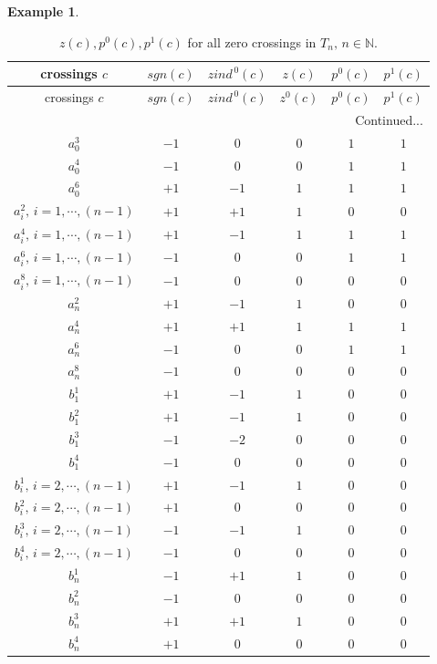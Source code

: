 \documentclass[10pt,a4paper,reqno]{amsart}
\theoremstyle{definition}
\newtheorem{example}{Example}[section]
\theoremstyle{remark}
\begin{document}
\begin{example}
\begin{longtable}{|c|c|c|c|c|c|}
	\hline
	crossings $c$ & $sgn(c)$ & $zind^{\,0}(c)$ & $z(c)$ & $p^{0}(c)$ & $p^{1}(c)$ \\ 
	\hline
	\endfirsthead
	
	\hline
	crossings $c$ & $sgn(c)$ & $zind^{\,0}(c)$ & $z^{0}(c)$ & $p^{0}(c)$ & $p^{1}(c)$ \\
	\hline
	\endhead
	
	\hline
	\multicolumn{6}{r}{{Continued...}} \\
	\endfoot
	
	\hline
	\addlinespace
	\caption{$z(c), p^{0}(c), p^{1}(c)$ for all zero crossings in $T_n,\, n \in \mathbb{N}$.} \label{tab:zero}
	\endlastfoot
	
	$a_{0}^{3}$ & $-1$ & $0$ & $0$ & $1$ & $1$ \\ 
	$a_{0}^{4}$ & $-1$ & $0$ & $0$ &$1$ & $1$ \\
	$a_{0}^{6}$ &$+1$ & $-1$&  $1$ & $1$ & $1$ \\ 
	\hline
	$a_{i}^{2},\, i=1,\cdots,(n-1)$ & $+1$ & $+1$ & $1$ & $0$ & $0$ \\ 
	$a_{i}^{4},\, i=1,\cdots,(n-1)$ & $+1$ & $-1$ & $1$ & $1$ & $1$ \\
	$a_{i}^{6},\, i=1,\cdots,(n-1)$ &$-1$ & $0$&  $0$ & $1$ & $1$ \\
	$a_{i}^{8},\, i=1,\cdots,(n-1)$ & $-1$ &  $0$ & $0$ & $0$ & $0$ \\ 
	\hline
	$a_{n}^{2}$ & $+1$ & $-1$ & $1$ & $0$ & $0$ \\ 
	$a_{n}^{4}$ & $+1$ & $+1$ & $1$ &$1$ & $1$ \\
	$a_{n}^{6}$ &$-1$ & $0$&  $0$ & $1$ & $1$ \\
	$a_{n}^{8}$ &$-1$ & $0$&  $0$ & $0$ & $0$ \\ 
	\hline
	$b_{1}^{1}$ & $+1$ & $-1$ & $1$ & $0$ & $0$ \\
	$b_{1}^{2}$ & $+1$ & $-1$ & $1$ & $0$ & $0$ \\
	$b_{1}^{3}$ & $-1$ & $-2$ & $0$ &  $0$ & $0$ \\
	$b_{1}^{4}$ & $-1$ & $0$ & $0$ &  $0$ & $0$ \\ 
	\hline
	$b_{i}^{1},\, i=2,\cdots,(n-1)$ & $+1$ & $-1$ & $1$ & $0$ & $0$ \\ 
	$b_{i}^{2},\, i=2,\cdots,(n-1)$ & $+1$ & $0$ & $0$ & $0$ & $0$ \\
	$b_{i}^{3},\, i=2,\cdots,(n-1)$ &$-1$ & $-1$&  $1$ & $0$ & $0$ \\
	$b_{i}^{4},\, i=2,\cdots,(n-1)$ & $-1$ &  $0$ & $0$ & $0$ & $0$ \\ 
	\hline
	$b_{n}^{1}$ & $-1$ & $+1$ & $1$ & $0$ & $0$ \\
	$b_{n}^{2}$ & $-1$ & $0$ & $0$ & $0$ & $0$ \\
	$b_{n}^{3}$ & $+1$ & $+1$ & $1$ &  $0$ & $0$ \\
	$b_{n}^{4}$ & $+1$ & $0$ & $0$ &  $0$ & $0$ \\
	\hline
	

\end{longtable}
\end{example}
\end{document}
